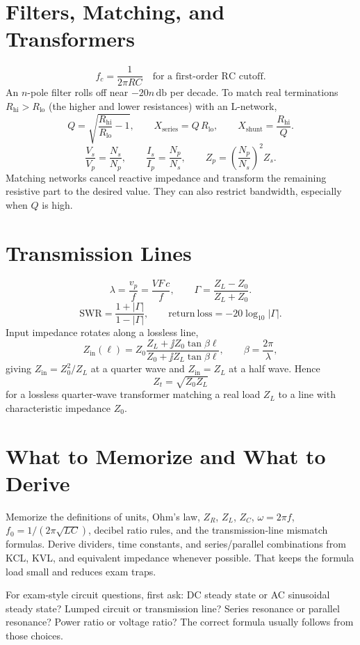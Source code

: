 \section{Filters, Matching, and Transformers}
\[
f_c=\frac{1}{2\pi RC}\quad \text{for a first-order RC cutoff.}
\]
An \(n\)-pole filter rolls off near \(-20n\,\si{\decibel}\) per decade. To match
real terminations \(R_{\text{hi}}>R_{\text{lo}}\) (the higher and lower resistances)
with an L-network,
\[
Q=\sqrt{\frac{R_{\text{hi}}}{R_{\text{lo}}}-1},
\qquad
X_{\text{series}}=Q\,R_{\text{lo}},
\qquad
X_{\text{shunt}}=\frac{R_{\text{hi}}}{Q}.
\]
\[
\frac{V_s}{V_p}=\frac{N_s}{N_p},
\qquad
\frac{I_s}{I_p}=\frac{N_p}{N_s},
\qquad
Z_p=\left(\frac{N_p}{N_s}\right)^2 Z_s.
\]
Matching networks cancel reactive impedance and transform the remaining
resistive part to the desired value. They can also restrict bandwidth, especially
when \(Q\) is high.

\section{Transmission Lines}
\[
\lambda=\frac{v_p}{f}=\frac{VF\,c}{f},
\qquad
\Gamma=\frac{Z_L-Z_0}{Z_L+Z_0}.
\]
\[
\mathrm{SWR}=\frac{1+|\Gamma|}{1-|\Gamma|},
\qquad
\mathrm{return\ loss}=-20\log_{10}|\Gamma|.
\]
Input impedance rotates along a lossless line,
\[
Z_{\mathrm{in}}(\ell)=Z_0\frac{Z_L+\jj Z_0\tan\beta\ell}{Z_0+\jj Z_L\tan\beta\ell},
\qquad
\beta=\frac{2\pi}{\lambda},
\]
giving \(Z_{\mathrm{in}}=Z_0^2/Z_L\) at a quarter wave and \(Z_{\mathrm{in}}=Z_L\)
at a half wave. Hence
\[
Z_t=\sqrt{Z_0Z_L}
\]
for a lossless quarter-wave transformer matching a real load \(Z_L\) to a line
with characteristic impedance \(Z_0\).

\section{What to Memorize and What to Derive}
Memorize the definitions of units, Ohm's law, \(Z_R\), \(Z_L\), \(Z_C\),
\(\omega=2\pi f\), \(f_0=1/(2\pi\sqrt{LC})\), decibel ratio rules, and the
transmission-line mismatch formulas. Derive dividers, time constants, and
series/parallel combinations from KCL, KVL, and equivalent impedance whenever
possible. That keeps the formula load small and reduces exam traps.

\begin{exambox}
For exam-style circuit questions, first ask: DC steady state or AC sinusoidal
steady state? Lumped circuit or transmission line? Series resonance or parallel
resonance? Power ratio or voltage ratio? The correct formula usually follows
from those choices.
\end{exambox}
